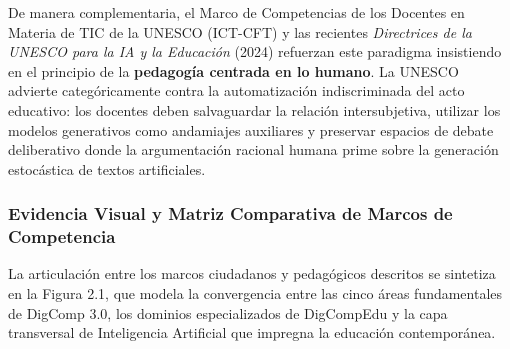 De manera complementaria, el Marco de Competencias de los Docentes en Materia de TIC de la UNESCO (ICT-CFT) y las recientes \textit{Directrices de la UNESCO para la IA y la Educación} (2024) refuerzan este paradigma insistiendo en el principio de la \textbf{pedagogía centrada en lo humano}. La UNESCO advierte categóricamente contra la automatización indiscriminada del acto educativo: los docentes deben salvaguardar la relación intersubjetiva, utilizar los modelos generativos como andamiajes auxiliares y preservar espacios de debate deliberativo donde la argumentación racional humana prime sobre la generación estocástica de textos artificiales.

\newpage

\subsubsection{Evidencia Visual y Matriz Comparativa de Marcos de Competencia}

La articulación entre los marcos ciudadanos y pedagógicos descritos se sintetiza en la Figura 2.1, que modela la convergencia entre las cinco áreas fundamentales de DigComp 3.0, los dominios especializados de DigCompEdu y la capa transversal de Inteligencia Artificial que impregna la educación contemporánea.

